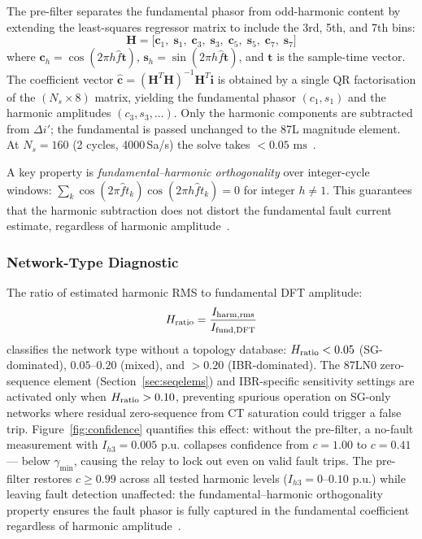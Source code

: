 \documentclass[journal,twoside,10pt]{IEEEtran}
\newcommand{\vect}[1]{\bm{#1}}
\newcommand{\pu}{\,\text{p.u.}}
\newcommand{\ms}{\,\text{ms}}
\begin{document}
The pre-filter separates the fundamental phasor from odd-harmonic content
by extending the least-squares regressor matrix to include the 3rd, 5th,
and 7th bins:
\begin{equation}
  \mathbf{H} = \bigl[\mathbf{c}_1,\; \mathbf{s}_1,\;
                      \mathbf{c}_3,\; \mathbf{s}_3,\;
                      \mathbf{c}_5,\; \mathbf{s}_5,\;
                      \mathbf{c}_7,\; \mathbf{s}_7\bigr]
  \label{eq:H}
\end{equation}
where $\mathbf{c}_h = \cos(2\pi h\hat{f} \mathbf{t})$,
$\mathbf{s}_h = \sin(2\pi h\hat{f} \mathbf{t})$, and $\mathbf{t}$ is the
sample-time vector.
The coefficient vector $\hat{\boldsymbol{c}} = (\mathbf{H}^T\mathbf{H})^{-1}\mathbf{H}^T\vect{i}$
is obtained by a single QR factorisation of the $(N_s \times 8)$ matrix,
yielding the fundamental phasor $(c_1, s_1)$ and the harmonic amplitudes
$(c_3, s_3, \ldots)$.  Only the harmonic components are subtracted from
$\Delta i'$; the fundamental is passed unchanged to the 87L magnitude
element.  At $N_s = 160$ (2 cycles, 4000\,Sa/s) the solve takes
${<}0.05\,\ms$~\cite{Sachdev1988,Oppenheim1999}.

A key property is \emph{fundamental--harmonic orthogonality} over integer-cycle
windows: $\sum_k \cos(2\pi \hat{f} t_k)\cos(2\pi h\hat{f} t_k) = 0$ for
integer $h \neq 1$.  This guarantees that the harmonic subtraction does not
distort the fundamental fault current estimate, regardless of harmonic
amplitude~\cite{SAMBP_TR21}.

\subsubsection{Network-Type Diagnostic}
\label{sec:hratio}

The ratio of estimated harmonic RMS to fundamental DFT amplitude:
\begin{equation}
  H_{\rm ratio} = \frac{I_{\rm harm,rms}}{I_{\rm fund,DFT}}
  \label{eq:hratio}
\end{equation}
classifies the network type without a topology database:
$H_{\rm ratio} < 0.05$ (SG-dominated),
$0.05$--$0.20$ (mixed), and $> 0.20$ (IBR-dominated).
The 87LN0 zero-sequence element (Section~\ref{sec:seqelems}) and
IBR-specific sensitivity settings are activated only when
$H_{\rm ratio} > 0.10$, preventing spurious operation on SG-only networks
where residual zero-sequence from CT saturation could trigger a false trip.
Figure~\ref{fig:confidence} quantifies this effect: without the pre-filter,
a no-fault measurement with $I_{h3} = 0.005\,\pu$ collapses confidence from
$c = 1.00$ to $c = 0.41$ --- below $\gamma_{\min}$, causing the relay to
lock out even on valid fault trips.
The pre-filter restores $c \geq 0.99$ across all tested harmonic levels
($I_{h3} = 0$--$0.10\,\pu$) while leaving fault detection unaffected:
the fundamental--harmonic orthogonality property ensures the fault phasor
is fully captured in the fundamental coefficient regardless of harmonic
amplitude~\cite{SAMBP_TR21}.
\end{document}
